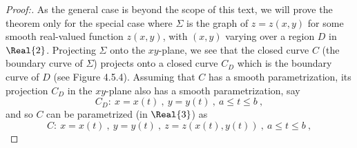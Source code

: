 \begin{proof}[Proof:]
 As the general case is beyond the scope of this text, we will prove the theorem only for the special case where
 $\Sigma$ is the graph of $z=z(x,y)$ for some smooth real-valued function $z(x,y)$, with $(x,y)$ varying over a region
 $D$ in $\Real{2}$. 
 Projecting $\Sigma$ onto the $xy$-plane, we see that the closed curve $C$ (the boundary curve of $\Sigma$) projects
 onto a closed curve $C_D$ which is the boundary curve of $D$ (see Figure 4.5.4). Assuming that $C$ has a smooth
 parametrization, its projection $C_D$ in the $xy$-plane also has a smooth parametrization, say
 \begin{displaymath}
  C_D:~ x=x(t)~,~ y=y(t)~,~ a \le t \le b ~,
 \end{displaymath}
 and so $C$ can be parametrized (in $\Real{3}$) as
 \begin{displaymath}
  C:~ x=x(t)~,~ y=y(t)~,~ z=z(x(t),y(t))~,~a \le t \le b ~,

\end{displaymath}
\end{proof}
